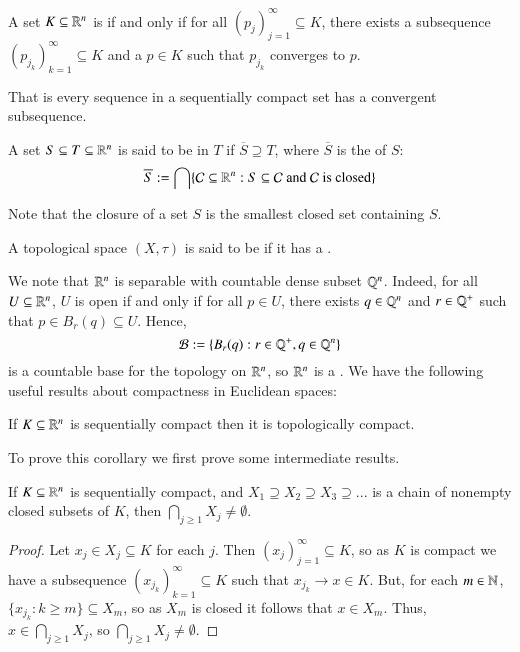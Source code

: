 \begin{definition}
    A set $K \subseteq \mathbb R^n$ is  if and only if for all $(p_j)_{j=1}^{\infty} \subseteq K$, there exists a subsequence $(p_{j_k})_{k=1}^{\infty} \subseteq K$ and a $p \in K$ such that $p_{j_k}$ converges to $p$.
\end{definition}

That is every sequence in a sequentially compact set has a convergent subsequence.

\begin{definition}
    A set $S \subseteq T\subseteq \mathbb R^n$ is said to be  in $T$ if $\overline{S} \supseteq T$, where $\overline{S}$ is the  of $S$: \begin{equation*}
        \overline{S} := \bigcap\{\mathcal{C}\subseteq \mathbb R^n:S\subseteq \mathcal{C}\text{ and }\mathcal{C}\text{ is closed}\}
    \end{equation*}
\end{definition}

Note that the closure of a set $S$ is the smallest closed set containing $S$.

\begin{definition}
    A topological space $(X,\tau)$ is said to be  if it has a .
\end{definition}

We note that $\mathbb R^n$ is separable with countable dense subset $\mathbb Q^n$. Indeed, for all $U \subseteq \mathbb R^n$, $U$ is open if and only if for all $p \in U$, there exists $q \in \mathbb Q^n$ and $r \in \mathbb Q^+$ such that $p \in B_r(q) \subseteq U$. Hence, \begin{equation*}
    \mathcal{B} := \{B_r(q):r\in \mathbb Q^+,q \in \mathbb Q^n\}
\end{equation*}
is a countable base for the topology on $\mathbb R^n$, so $\mathbb R^n$ is a . We have the following useful results about compactness in Euclidean spaces:

\begin{corollary}
    If $K\subseteq \mathbb R^n$ is sequentially compact then it is topologically compact.
\end{corollary}

To prove this corollary we first prove some intermediate results.

\begin{proposition}
    If $K \subseteq \mathbb R^n$ is sequentially compact, and $X_1 \supseteq X_2\supseteq X_3\supseteq ...$ is a chain of nonempty closed subsets of $K$, then $\bigcap_{j\geq 1}X_j \neq \emptyset$.
\end{proposition}
\begin{proof}
    Let $x_j \in X_j \subseteq K$ for each $j$. Then $(x_j)_{j=1}^{\infty} \subseteq K$, so as $K$ is compact we have a subsequence $(x_{j_k})_{k=1}^{\infty} \subseteq K$ such that $x_{j_k}\rightarrow x \in K$. But, for each $m \in \mathbb N$, $\{x_{j_k}:k \geq m\} \subseteq X_m$, so as $X_m$ is closed it follows that $x \in X_m$. Thus, $x \in \bigcap_{j\geq 1}X_j$, so $\bigcap_{j\geq 1}X_j \neq \emptyset$.
\end{proof}

